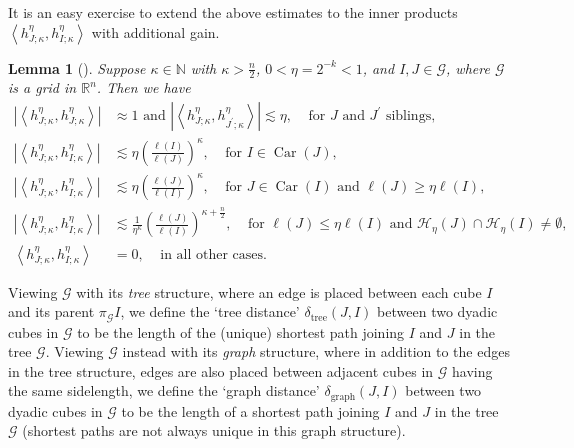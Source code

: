 \documentclass{amsart}%
\theoremstyle{plain}
\newtheorem{lemma}[theorem]{Lemma}
\numberwithin{equation}{section}
\begin{document}
It is an easy exercise to extend the above estimates to the inner products
$\left\langle h_{J;\kappa}^{\eta},h_{I;\kappa}^{\eta}\right\rangle $ with
additional gain.

\begin{lemma}
[{\cite[Lemma 19]{Saw7}}]\label{inner est'}Suppose $\kappa\in\mathbb{N}$ with
$\kappa>\frac{n}{2}$, $0<\eta=2^{-k}<1$, and $I,J\in\mathcal{G}$, where
$\mathcal{G}$ is a grid in $\mathbb{R}^{n}$. Then we have%
\begin{align*}
\left\vert \left\langle h_{J;\kappa}^{\eta},h_{J;\kappa}^{\eta}\right\rangle
\right\vert  & \approx1\text{ and }\left\vert \left\langle h_{J;\kappa}^{\eta
},h_{J^{\prime};\kappa}^{\eta}\right\rangle \right\vert \lesssim
\eta,\ \ \ \ \ \text{for }J\text{ and }J^{\prime}\text{ siblings},\\
\left\vert \left\langle h_{J;\kappa}^{\eta},h_{I;\kappa}^{\eta}\right\rangle
\right\vert  & \lesssim\eta\left(  \frac{\ell\left(  I\right)  }{\ell\left(
J\right)  }\right)  ^{\kappa},\ \ \ \ \ \text{for }I\in\operatorname*{Car}%
\left(  J\right)  ,\\
\left\vert \left\langle h_{J;\kappa}^{\eta},h_{I;\kappa}^{\eta}\right\rangle
\right\vert  & \lesssim\eta\left(  \frac{\ell\left(  J\right)  }{\ell\left(
I\right)  }\right)  ^{\kappa},\ \ \ \ \ \text{for }J\in\operatorname*{Car}%
\left(  I\right)  \text{ and }\ell\left(  J\right)  \geq\eta\ell\left(
I\right)  ,\\
\left\vert \left\langle h_{J;\kappa}^{\eta},h_{I;\kappa}^{\eta}\right\rangle
\right\vert  & \lesssim\frac{1}{\eta^{\kappa}}\left(  \frac{\ell\left(
J\right)  }{\ell\left(  I\right)  }\right)  ^{\kappa+\frac{n}{2}%
},\ \ \ \ \ \text{for }\ell\left(  J\right)  \leq\eta\ell\left(  I\right)
\text{ and }\mathcal{H}_{\eta}\left(  J\right)  \cap\mathcal{H}_{\eta}\left(
I\right)  \neq\emptyset,\\
\left\langle h_{J;\kappa}^{\eta},h_{I;\kappa}^{\eta}\right\rangle  &
=0,\ \ \ \ \ \text{in all other cases}.
\end{align*}

\end{lemma}

Viewing $\mathcal{G}$ with its \emph{tree} structure, where an edge is placed
between each cube $I$ and its parent $\pi_{\mathcal{G}}I$, we define the `tree
distance' $\delta_{\operatorname*{tree}}\left(  J,I\right)  $ between two
dyadic cubes in $\mathcal{G}$ to be the length of the (unique) shortest path
joining $I$ and $J$ in the tree $\mathcal{G}$. Viewing $\mathcal{G}$ instead
with its \emph{graph} structure, where in addition to the edges in the tree
structure, edges are also placed between adjacent cubes in $\mathcal{G}$
having the same sidelength, we define the `graph distance' $\delta
_{\operatorname*{graph}}\left(  J,I\right)  $ between two dyadic cubes in
$\mathcal{G}$ to be the length of a shortest path joining $I$ and $J$ in the
tree $\mathcal{G}$ (shortest paths are not always unique in this graph structure).
\end{document}
